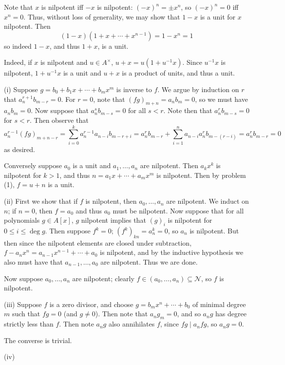 \documentclass{solutions}
\date{\today}
\begin{document}
\maketitle

\begin{question}
Note that $x$ is nilpotent iff $-x$ is nilpotent: $(-x)^n = \pm x^n$, so $(-x)^n = 0$ iff $x^n = 0$.
Thus, without loss of generality, we may show that $1 - x$ is a unit for $x$ nilpotent.
Then
\[ (1 - x)(1 + x + \cdots + x^{n-1}) = 1 - x^n = 1 \]
so indeed $1 - x$, and thus $1 + x$, is a unit.

Indeed, if $x$ is nilpotent and $u\in A^\times$, $u + x = u(1 + u^{-1}x)$.
Since $u^{-1}x$ is nilpotent, $1 + u^{-1}x$ is a unit and $u + x$ is a product of units, and thus a unit.
\end{question}

\begin{question}
(i) Suppose $g = b_0 + b_1 x + \cdots + b_m x^m$ is inverse to $f$.
We argue by induction on $r$ that $a_n^{r + 1} b_{m - r} = 0$.
For $r = 0$, note that $(fg)_{m + n} = a_nb_m = 0$, so we must have $a_nb_m = 0$.
Now suppose that $a_n^s b_{m - s} = 0$ for all $s < r$.
Note then that $a_n^r b_{m - s} = 0$ for $s < r$.
Then observe that
\[ a_n^{r-1} (fg)_{m + n - r} = \sum_{i=0}^k a_n^{r-1} a_{n - i} b_{m - r + i} = a_n^r b_{m - r} + \sum_{i=1}^n a_{n - i} a_n^r b_{m - (r - i)}= a_n^r b_{m -r} = 0 \]
as desired.

Conversely suppose $a_0$ is a unit and $a_1, \ldots, a_n$ are nilpotent.
Then $a_k x^k$ is nilpotent for $k > 1$, and thus $n = a_1 x + \cdots + a_m x^m$ is nilpotent.
Then by problem (1), $f = u + n$ is a unit.

(ii) First we show that if $f$ is nilpotent, then $a_0, \ldots, a_n$ are nilpotent.
We induct on $n$; if $n = 0$, then $f = a_0$ and thus $a_0$ must be nilpotent.
Now suppose that for all polynomials $g\in A[x]$, $g$ nilpotent implies that $(g)_i$ is nilpotent for $0\leq i\leq \deg g$.
Then suppose $f^k = 0$; $(f^k)_{kn} = a_n^k = 0$, so $a_n$ is nilpotent.
But then since the nilpotent elements are closed under subtraction, $f - a_nx^n = a_{n-1} x^{n-1} + \cdots + a_0$ is nilpotent, and by the inductive hypothesis we also must have that $a_{n-1}, \ldots, a_0$ are nilpotent.
Thus we are done.

Now suppose $a_0, \ldots, a_n$ are nilpotent; clearly $f\in (a_0, \ldots, a_n)\subseteq \mathcal{N}$, so $f$ is nilpotent.

(iii) Suppose $f$ is a zero divisor, and choose $g = b_m x^n + \cdots + b_0$ of minimal degree $m$ such that $fg = 0$ (and $g\neq 0$).
Then note that $a_n g_m = 0$, and so $a_n g$ has degree strictly less than $f$.
Then note $a_n g$ also annihilates $f$, since $fg\mid a_n fg$, so $a_n g = 0$.

The converse is trivial.

(iv) 
\end{question}
\end{document}
